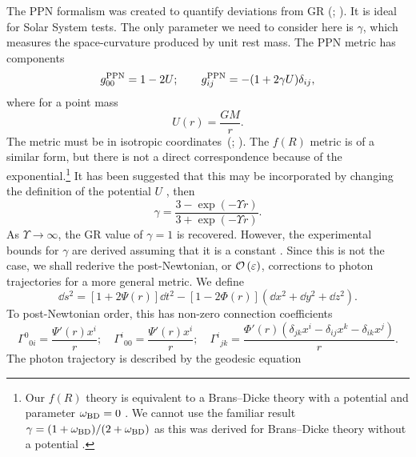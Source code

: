 The PPN formalism was created to quantify deviations from GR (\citealt[chapter 4]{Will1993}; \citealt{Will2006}). It is ideal for Solar System tests. The only parameter we need to consider here is $\gamma$, which measures the space-curvature produced by unit rest mass. The PPN metric has components
\begin{equation}
g^\mathrm{PPN}_{00} = 1 - 2U; \qquad g^\mathrm{PPN}_{ij} = -(1 + 2\gamma U)\delta_{ij},
\end{equation}
where for a point mass
\begin{equation}
U(r) = \frac{GM}{r}.
\end{equation}
The metric must be in isotropic coordinates~(\citealt[section 40.1]{Misner1973}; \citealt[section 4.1(c)]{Will1993}). The $f(R)$ metric  is of a similar form, but there is not a direct correspondence because of the exponential.\footnote{Our $f(R)$ theory is equivalent to a Brans--Dicke theory with a potential and parameter $\omega_\mathrm{BD} = 0$ \citep{Teyssandier1983, Wands1994}. We cannot use the familiar result $\gamma = (1 + \omega_\mathrm{BD})/(2 + \omega_\mathrm{BD})$ \citep{Will2006} as this was derived for Brans--Dicke theory without a potential \citep[section 5.3]{Will1993}.} It has been suggested that this may be incorporated by changing the definition of the potential $U$ \citep{Olmo2007c, Faulkner2007, Bisabr2010, DeFelice2010}, then
\begin{equation}
\gamma = \frac{3 - \exp(-\Upsilon r)}{3 + \exp(-\Upsilon r)}.
\end{equation}
As $\Upsilon \rightarrow \infty$, the GR value of $\gamma = 1$ is recovered. However, the experimental bounds for $\gamma$ are derived assuming that it is a constant \citep[section 6.1]{Will1993}. Since this is not the case, we shall rederive the post-Newtonian, or $\mathcal{O}\left({\varepsilon}\right)$, corrections to photon trajectories for a more general metric. We define
\begin{equation}
\dd s^2 = \left[1+2\Psi(r)\right]\dd t^2 - \left[1 - 2\Phi(r)\right]\left(\dd x^2 + \dd y^2 + \dd z^2\right).
\end{equation}
To post-Newtonian order, this has non-zero connection coefficients
\begin{equation}
{\Gamma^0}_{0i} = \frac{\Psi'(r) x^i}{r}; \quad {\Gamma^i}_{00} = \frac{\Psi'(r) x^i}{r}; \quad
{\Gamma^i}_{jk} = \frac{\Phi'(r)\left(\delta_{jk}x^i - \delta_{ij}x^k - \delta_{ik}x^j\right)}{r}.
\end{equation}
The photon trajectory is described by the geodesic equation
